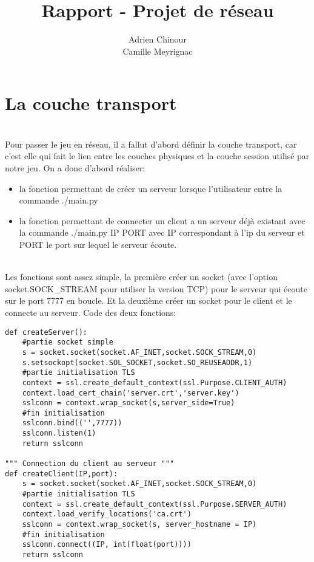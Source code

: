 \documentclass[12pt]{article}
\title{\textbf{Rapport - Projet de réseau}}
\author{Adrien Chinour\\Camille Meyrignac}
\begin{document}
\maketitle

\tableofcontents

\section{La couche transport}

\textnormal{
\\Pour passer le jeu en réseau, il a fallut d'abord définir la couche transport, car c'est elle qui fait le lien entre les couches physiques et la couche session utilisé par notre jeu. On a donc d'abord réaliser:
}

\begin{itemize}
\item la fonction permettant de créer un serveur lorsque l'utilisateur entre la commande ./main.py
\item la fonction permettant de connecter un client a un serveur déjà existant avec la commande ./main.py IP PORT avec IP correspondant à l'ip du serveur et PORT le port sur lequel le serveur écoute.
\end{itemize}
\textnormal{
\\Les fonctions sont assez simple, la première créer un socket (avec l'option socket.SOCK\_STREAM pour utiliser la version TCP) pour le serveur qui écoute sur le port 7777 en boucle.
Et la deuxième créer un socket pour le client et le connecte au serveur. Code des deux fonctions:
}

\begin{verbatim}
def createServer():
    #partie socket simple
    s = socket.socket(socket.AF_INET,socket.SOCK_STREAM,0)
    s.setsockopt(socket.SOL_SOCKET,socket.SO_REUSEADDR,1)
    #partie initialisation TLS
    context = ssl.create_default_context(ssl.Purpose.CLIENT_AUTH)
    context.load_cert_chain('server.crt','server.key')
    sslconn = context.wrap_socket(s,server_side=True)
    #fin initialisation
    sslconn.bind(('',7777))
    sslconn.listen(1)
    return sslconn

""" Connection du client au serveur """
def createClient(IP,port):
    s = socket.socket(socket.AF_INET,socket.SOCK_STREAM,0)
    #partie initialisation TLS
    context = ssl.create_default_context(ssl.Purpose.SERVER_AUTH)
    context.load_verify_locations('ca.crt')
    sslconn = context.wrap_socket(s, server_hostname = IP)
    #fin initialisation
    sslconn.connect((IP, int(float(port))))
    return sslconn
\end{verbatim}
\end{document}
